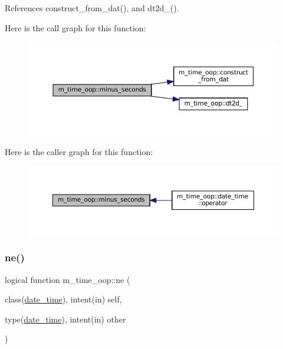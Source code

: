 References construct\+\_\+from\+\_\+dat(), and dt2d\+\_\+().

Here is the call graph for this function\+:\nopagebreak
\begin{figure}[H]
\begin{center}
\leavevmode
\includegraphics[width=350pt]{namespacem__time__oop_a395fbf19c6617641aea39c33fd4b2087_cgraph}
\end{center}
\end{figure}
Here is the caller graph for this function\+:\nopagebreak
\begin{figure}[H]
\begin{center}
\leavevmode
\includegraphics[width=350pt]{namespacem__time__oop_a395fbf19c6617641aea39c33fd4b2087_icgraph}
\end{center}
\end{figure}
\mbox{\label{namespacem__time__oop_a7707a7cbd4869301a613ceeb12ed2384}} 
\subsubsection{\texorpdfstring{ne()}{ne()}}
{\footnotesize\ttfamily logical function m\+\_\+time\+\_\+oop\+::ne (\begin{DoxyParamCaption}\item[{class(\mbox{\hyperlink{structm__time__oop_1_1date__time}{date\+\_\+time}}), intent(in)}]{self,  }\item[{type(\mbox{\hyperlink{structm__time__oop_1_1date__time}{date\+\_\+time}}), intent(in)}]{other }\end{DoxyParamCaption})\hspace{0.3cm}{\ttfamily [private]}}



